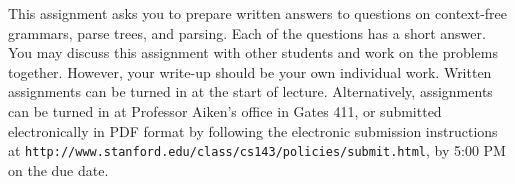 \documentclass[11pt]{article}
\begin{document}

This assignment asks you to prepare written answers to questions on
context-free grammars, parse trees, and parsing.  Each of the
questions has a short answer.  You may discuss this assignment with
other students and work on the problems together.  However, your
write-up should be your own individual work.  Written assignments can
be turned in at the start of lecture.  Alternatively, assignments can
be turned in at Professor Aiken's office in Gates 411, or submitted
electronically in PDF format by following the electronic submission
instructions at
\texttt{http://www.stanford.edu/class/cs143/policies/submit.html}, by
5:00 PM on the due date.

\bigskip
\bigskip
\end{document}
